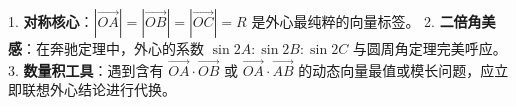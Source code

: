 \begin{summarybox}
1. \textbf{对称核心}：$|\vec{OA}|=|\vec{OB}|=|\vec{OC}|=R$ 是外心最纯粹的向量标签。
2. \textbf{二倍角美感}：在奔驰定理中，外心的系数 $\sin 2A : \sin 2B : \sin 2C$ 与圆周角定理完美呼应。
3. \textbf{数量积工具}：遇到含有 $\vec{OA} \cdot \vec{OB}$ 或 $\vec{OA} \cdot \vec{AB}$ 的动态向量最值或模长问题，应立即联想外心结论进行代换。
\end{summarybox}